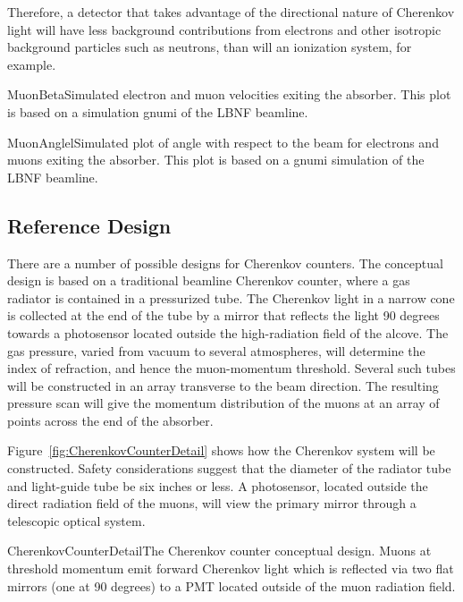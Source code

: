 Therefore, a detector that takes advantage of the directional nature of Cherenkov
light will have less background contributions from
electrons 
and other isotropic background particles such as neutrons, than will an ionization system, for example. 

\begin{cdrfigure}{MuonBeta}{Simulated electron and muon velocities exiting the absorber. This plot is based on a 
simulation gnumi\cite{GNuMI} of the LBNF beamline.}
\end{cdrfigure}


\begin{cdrfigure}{MuonAngle}{lSimulated plot of angle with respect to the beam for 
electrons and muons exiting the absorber.
This plot is based on a gnumi simulation of the LBNF beamline.}
\end{cdrfigure}


\subsection{Reference Design}

There are a number of possible designs for Cherenkov counters. The
conceptual design is based on a traditional beamline Cherenkov
counter, where a gas radiator is contained in a pressurized tube. The
Cherenkov light in a narrow cone is collected at the end of the tube
by a mirror that reflects the light 90 degrees towards a photosensor
located outside the high-radiation field of the alcove. The gas
pressure, varied from vacuum to several atmospheres, will determine
the index of refraction, and hence the muon-momentum
threshold. Several such tubes will be constructed in an array
transverse to the beam direction. The resulting pressure scan will
give the momentum distribution of the muons at an array of points
across the end of the absorber.  

Figure~\ref{fig:CherenkovCounterDetail} shows how the
Cherenkov system will 
be constructed. Safety considerations suggest that the
diameter of the radiator tube and light-guide tube be six inches
or less.  A 
photosensor, located outside the direct radiation field of the muons, will
view the primary mirror through a telescopic optical system.

\begin{cdrfigure}[[Cherenkov counter design]{CherenkovCounterDetail}{The Cherenkov counter conceptual design. 
Muons at threshold momentum emit forward Cherenkov light which is
reflected via two flat mirrors (one at 90 degrees) 
to a PMT located outside of the muon
radiation field.}
\end{cdrfigure}

